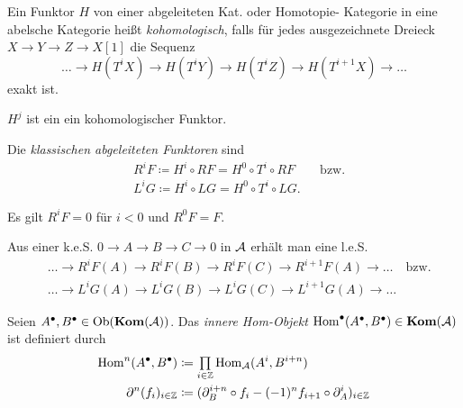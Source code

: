 \documentclass{cheat-sheet}
\newcommand{\CCC}[1]{{#1}^{\bullet}} %
\DeclareMathOperator{\Ext}{Ext} %
\begin{document}
\begin{defn}
  Ein Funktor $H$ von einer abgeleiteten Kat. oder Homotopie- Kategorie in eine abelsche Kategorie heißt \emph{kohomologisch}, falls für jedes ausgezeichnete Dreieck $X \to Y \to Z \to X[1]$ die Sequenz
  \[ \ldots \to H(T^i X) \to H(T^i Y) \to H(T^i Z) \to H(T^{i+1} X) \to \ldots \]
  exakt ist.
\end{defn}

\begin{bsp}
  $H^j$ ist ein ein kohomologischer Funktor.
\end{bsp}

\begin{defn}
  Die \emph{klassischen abgeleiteten Funktoren} sind
  \begin{align*}
    & R^i F \coloneqq H^i \circ RF = H^0 \circ T^i \circ RF
    \qquad \text{bzw.} \\
    & L^i G \coloneqq H^i \circ LG = H^0 \circ T^i \circ LG.
  \end{align*}
\end{defn}

\begin{bem}
  Es gilt $R^i F = 0$ für $i < 0$ und $R^0 F = F$.
\end{bem}

\begin{bem}
  Aus einer k.e.S. $0 \!\to\! A \!\to\! B \!\to\! C \!\to\! 0$ in $\mathcal{A}$ erhält man eine l.e.S.
  \begin{align*}
    & \ldots \to R^i F(A) \to R^i F(B) \to R^i F(C) \to R^{i+1} F(A) \to \ldots \quad \text{bzw.} \\
    & \ldots \to L^i G(A) \to L^i G(B) \to L^i G(C) \to L^{i+1} G(A) \to \ldots
  \end{align*}
\end{bem}

\begin{defn}
  Seien $\CCC{A}, \CCC{B} \in \Ob(\Kom(\Aat))$. Das \emph{innere Hom-Objekt} $\CCC{\Hom}(\CCC{A}, \CCC{B}) \in \Kom(\Aat)$ ist definiert durch
  \begin{align*}
    \Hom^n(\CCC{A}, \CCC{B}) & \coloneqq \prod_{i \in \Z} \Hom_\Aat(A^i, B^{i+n}) \\
    \partial^n (f_i)_{i \in \Z} & \coloneqq (\partial_B^{i+n} \circ f_i - (-1)^n f_{i+1} \circ \partial_A^i)_{i \in \Z}
  \end{align*}
\end{defn}
\end{document}
